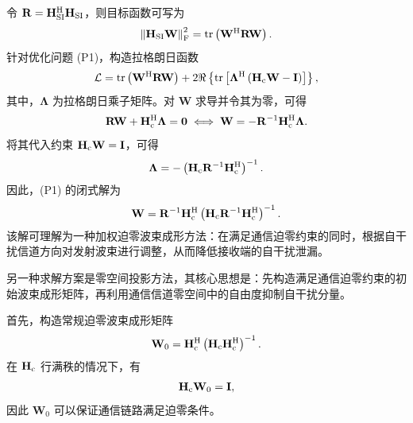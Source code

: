 \documentclass[onecolumn,10pt]{IEEEtran}
\begin{document}
令 $\mathbf{R}=\mathbf{H}_{\rm SI}^{\rm H}\mathbf{H}_{\rm SI}$，则目标函数可写为
\begin{align}
    \left\lVert \mathbf{H}_{\rm SI}\mathbf{W} \right\rVert_{\rm F}^2
    =
    \mathrm{tr}\left( \mathbf{W}^{\rm H}\mathbf{R}\mathbf{W} \right).
\end{align}
针对优化问题 (P1)，构造拉格朗日函数
\begin{align}
    \mathcal{L}
    =
    \mathrm{tr}\left( \mathbf{W}^{\rm H}\mathbf{R}\mathbf{W} \right)
    +
    2\Re\left\{
    \mathrm{tr}\left[
    \mathbf{\Lambda}^{\rm H}\left( \mathbf{H}_{\rm c}\mathbf{W}-\mathbf{I} \right)
    \right]
    \right\},
\end{align}
其中，$\mathbf{\Lambda}$ 为拉格朗日乘子矩阵。对 $\mathbf{W}$ 求导并令其为零，可得
\begin{align}
    \mathbf{R}\mathbf{W}+\mathbf{H}_{\rm c}^{\rm H}\mathbf{\Lambda}=\mathbf{0}
    \;\Longleftrightarrow\;
    \mathbf{W}=-\mathbf{R}^{-1}\mathbf{H}_{\rm c}^{\rm H}\mathbf{\Lambda}.
\end{align}
将其代入约束 $\mathbf{H}_{\rm c}\mathbf{W}=\mathbf{I}$，可得
\begin{align}
    \mathbf{\Lambda}
    =
    -\left( \mathbf{H}_{\rm c}\mathbf{R}^{-1}\mathbf{H}_{\rm c}^{\rm H} \right)^{-1}.
\end{align}
因此，(P1) 的闭式解为
\begin{align}
    \mathbf{W}
    =
    \mathbf{R}^{-1}\mathbf{H}_{\rm c}^{\rm H}
    \left( \mathbf{H}_{\rm c}\mathbf{R}^{-1}\mathbf{H}_{\rm c}^{\rm H} \right)^{-1}.
\end{align}
该解可理解为一种加权迫零波束成形方法：在满足通信迫零约束的同时，根据自干扰信道方向对发射波束进行调整，从而降低接收端的自干扰泄漏。

另一种求解方案是零空间投影方法，其核心思想是：先构造满足通信迫零约束的初始波束成形矩阵，再利用通信信道零空间中的自由度抑制自干扰分量。

首先，构造常规迫零波束成形矩阵
\begin{align}
    \mathbf{W}_0
    =
    \mathbf{H}_{\rm c}^{\rm H}
    \left( \mathbf{H}_{\rm c}\mathbf{H}_{\rm c}^{\rm H} \right)^{-1}.
\end{align}
在 $\mathbf{H}_{\rm c}$ 行满秩的情况下，有
\begin{align}
    \mathbf{H}_{\rm c}\mathbf{W}_0 = \mathbf{I},
\end{align}
因此 $\mathbf{W}_0$ 可以保证通信链路满足迫零条件。
\end{document}
